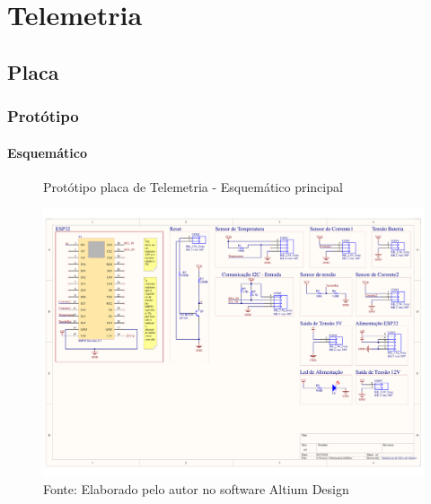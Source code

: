 \documentclass[../delivery_hospital_report.tex]{subfiles}
\begin{document}
\section{Telemetria}
\subsection{Placa}

\subsubsection{Protótipo}

\paragraph{Esquemático}

\begin{figure}[h]
\centering
    \caption{Protótipo placa de Telemetria - Esquemático principal }
    \centering %
    \includegraphics[width=17cm]{modulos/Telemetria-1.png}
    \caption*{Fonte: Elaborado pelo autor no software Altium Design\cite{altium21} }
    \label{Protótipo placa de ## - Esquemático principal}
\end{figure}
\end{document}
